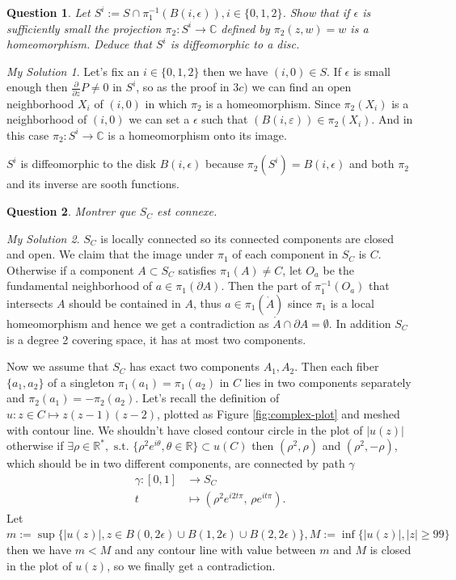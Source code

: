 \documentclass[]{article}
\newtheorem{prop}{Question}
\theoremstyle{remark}
\newtheorem*{sol}{My Solution}
\begin{document}
\begin{prop}
	Let $S^{i}:=S \cap \pi_{1}^{-1}(B(i, \epsilon)), i \in\{0,1,2\}$. Show that if $\epsilon$ is sufficiently small the projection $\pi_{2}: S^{i} \rightarrow \mathbb{C}$ defined by $\pi_{2}(z, w)=w$ is a homeomorphism. Deduce that $S^{i}$ is diffeomorphic to a disc.
\end{prop}
\begin{sol}
	Let's fix an $ i \in \{0,1,2\} $ then we have $ (i,0)\in S $. If $ \epsilon $ is small enough then $\frac{\partial}{\partial z} P \neq 0$ in $ S^i $, so as the proof in $ 3c) $ we can find an open neighborhood $ X_i $ of $ (i,0)$ in which $ \pi_{2} $ is a homeomorphism. Since $  \pi_{2}(X_i) $ is a neighborhood of $ (i,0) $ we can set a $ \epsilon $ such that $ (B(i, \varepsilon)) \in \pi_{2}(X_i) $. And in this case  $\pi_{2}: S^{i} \rightarrow \mathbb{C}$ is a homeomorphism onto its image. 
	
	$S^{i}$ is diffeomorphic to the disk $ B(i, \epsilon) $ because $ \pi_{2}(S^i) = B(i, \epsilon) $ and both $ \pi_{2} $ and its inverse are sooth functions.
\end{sol}
\begin{prop}
	Montrer que $ S_C $ est connexe.
\end{prop}
\begin{sol}
	$ S_C $ is locally connected so its connected components are closed and open. We claim that the image under $ \pi_{1} $ of each component in $ S_C $ is $ C $. Otherwise if a component $ A \subset S_C $ satisfies $ \pi_{1}(A) \ne C $, let $ O_a $ be the fundamental neighborhood of $ a \in \pi_{1}(\partial A)$. Then the part of $ \pi_{1}^{-1}(O_a) $  that intersects $ A $ should be contained in $ A $, thus $ a \in \pi_{1}(\mathring A) $ since $ \pi_{1} $ is a local homeomorphism and hence we get a contradiction as $ \mathring A \cap \partial A = \emptyset $. In addition $ S_C $ is a degree 2  covering space, it has at most two components.
	
	Now we assume that $ S_C $ has exact two components $ A_1, A_2 $. Then each fiber $ \{a_1, a_2\}$ of a singleton $ \pi_{1}(a_1) = \pi_{1}(a_2) $ in $ C $ lies in two components separately and $\pi_{2}(a_1) = -\pi_{2}(a_2) $. Let's recall the definition of $ u: z\in C \mapsto z(z-1)(z-2) $, plotted as Figure \ref{fig:complex-plot} and meshed with contour line. We shouldn't have closed contour circle in the plot of $ |u(z)| $ otherwise if $ \exists \rho\in \mathbb{R}^{*},\text{ s.t. }\{\rho^2 e^{i \theta}, \theta \in \mathbb{R}\} \subset u(C) $ 
	 then $ (\rho^2,\rho) $ and $ (\rho^2,-\rho)  $, which should be in two different components, are connected by path $\gamma$
	 \[  \begin{aligned}
	 \gamma : [0,1] &\rightarrow S_C \\
	 t & \mapsto (\rho^2 e^{i2t\pi} ,\,\rho e^{it\pi}).
	 \end{aligned}\] Let $ m:=\sup\{|u(z)|, z \in B(0, 2\epsilon) \cup B(1, 2\epsilon) \cup B(2, 2\epsilon) \} , M :=\inf\{|u(z)|, |z| \ge 99\}$ then we have $ m < M $ and any contour line  with value between $ m $ and $ M $ is closed in the plot of $ u(z) $, so we finally get a contradiction.
\end{sol}
\end{document}
